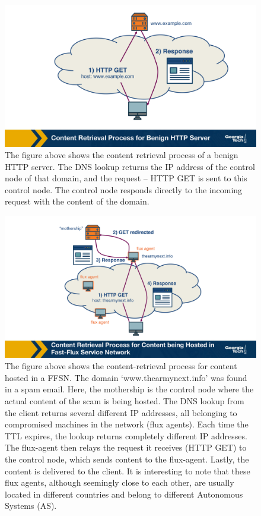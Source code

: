 \documentclass[11pt]{article}
\begin{document}
\begin{figure}[htbp]
\centering
\includegraphics[width=.9\linewidth]{./MD_Figures/9_dns_abuse_1.png}
\caption{\label{fig:orgc301143}The figure above shows the content retrieval process of a benign HTTP server. The DNS lookup returns the IP address of the control node of that domain, and the request – HTTP GET is sent to this control node. The control node responds directly to the incoming request with the content of the domain.}
\end{figure}


\begin{figure}[htbp]
\centering
\includegraphics[width=.9\linewidth]{./MD_Figures/9_dns_abuse_2.png}
\caption{\label{fig:org3abc039}The figure above shows the content-retrieval process for content hosted in a FFSN. The domain ‘www.thearmynext.info’ was found in a spam email. Here, the mothership is the control node where the actual content of the scam is being hosted. The DNS lookup from the client returns several different IP addresses, all belonging to compromised machines in the network (flux agents). Each time the TTL expires, the lookup returns completely different IP addresses. The flux-agent then relays the request it receives (HTTP GET) to the control node, which sends content to the flux-agent. Lastly, the content is delivered to the client. It is interesting to note that these flux agents, although seemingly close to each other, are usually located in different countries and belong to different Autonomous Systems (AS).}
\end{figure}
\end{document}
